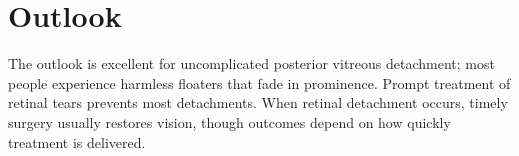 \section{Outlook}
The outlook is excellent for uncomplicated posterior vitreous detachment; most people experience harmless floaters that fade in prominence. Prompt treatment of retinal tears prevents most detachments. When retinal detachment occurs, timely surgery usually restores vision, though outcomes depend on how quickly treatment is delivered.
